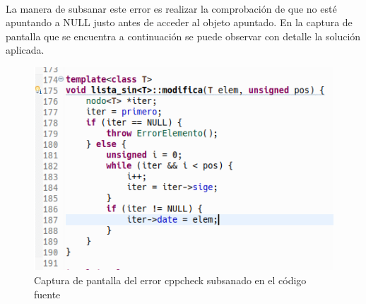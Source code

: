 			\paragraph{}La manera de subsanar este error es realizar la comprobación de que no esté apuntando a NULL justo antes de acceder al objeto apuntado. En la captura de pantalla que se encuentra a continuación se puede observar con detalle la solución aplicada.
			
			\begin{figure}[H]
				\centering
				\includegraphics[scale=0.55]{img/captura90.png}
				\caption{Captura de pantalla del error cppcheck subsanado en el código fuente}
				\label{captura90}
			\end{figure}
\newpage
